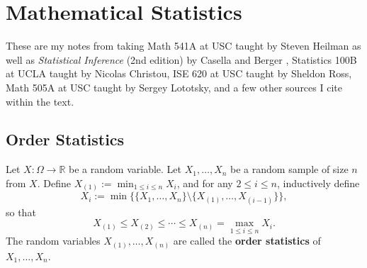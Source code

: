 %
%
%
%
%
%
%
%
%
%
%
%
%

\section{Mathematical Statistics}

These are my notes from taking Math 541A at USC taught by Steven Heilman as well as \textit{Statistical Inference} (2nd edition) by Casella and Berger \citep{CaseBerg:01}, Statistics 100B at UCLA taught by Nicolas Christou, ISE 620 at USC taught by Sheldon Ross, Math 505A at USC taught by Sergey Lototsky, and a few other sources I cite within the text.

\subsection{Order Statistics}

\begin{definition} Let \(X:\Omega\to\mathbb{R}\) be a random variable.  Let $X_{1},\ldots,X_{n}$ be a random sample of size $n$ from $X$.  Define $X_{(1)}:=\min_{1\leq i\leq n}X_{i}$, and for any $2\leq i\leq n$, inductively define
$$X_{i}:=\min\Big\{\{X_{1},\ldots,X_{n}\}\setminus\{X_{(1)},\ldots,X_{(i-1)}\}\Big\},$$
so that
$$X_{(1)}\leq X_{(2)}\leq\cdots\leq X_{(n)}=\max_{1\leq i\leq n}X_{i}.$$
The random variables $X_{(1)},\ldots,X_{(n)}$ are called the \textbf{order statistics} of $X_{1},\ldots,X_{n}$.


\end{definition}

